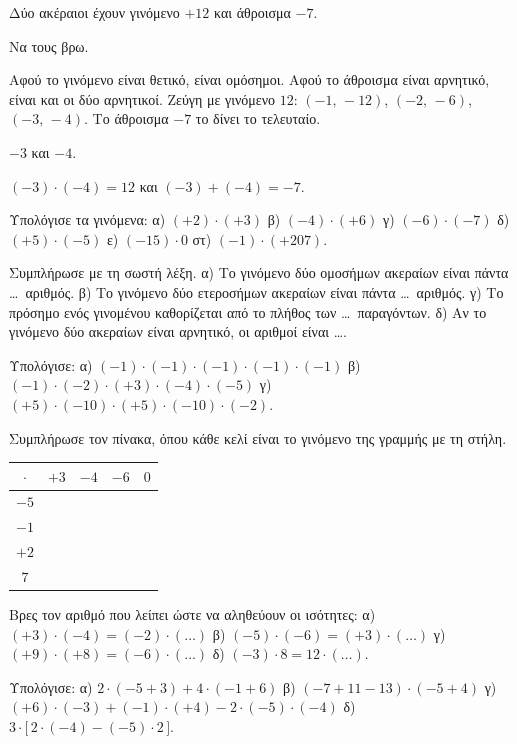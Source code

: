 \tixero Δύο ακέραιοι έχουν γινόμενο $+12$ και άθροισμα $-7$.\par
\tithelo Να τους βρω.\par
\possindeo Αφού το γινόμενο είναι θετικό, είναι ομόσημοι. Αφού το άθροισμα είναι αρνητικό, είναι και οι δύο αρνητικοί. Ζεύγη με γινόμενο $12$: $(-1,\,-12)$, $(-2,\,-6)$, $(-3,\,-4)$. Το άθροισμα $-7$ το δίνει το τελευταίο.\par
\apantisi $-3$ και $-4$.\par
\elegxos $(-3)\cdot(-4)=12$ και $(-3)+(-4)=-7$.



\ex Υπολόγισε τα γινόμενα: α) $(+2)\cdot(+3)$ \quad β) $(-4)\cdot(+6)$ \quad γ) $(-6)\cdot(-7)$ \quad δ) $(+5)\cdot(-5)$ \quad ε) $(-15)\cdot0$ \quad στ) $(-1)\cdot(+207)$.

\ex Συμπλήρωσε με τη σωστή λέξη. α) Το γινόμενο δύο ομοσήμων ακεραίων είναι πάντα \ldots\ αριθμός. β) Το γινόμενο δύο ετεροσήμων ακεραίων είναι πάντα \ldots\ αριθμός. γ) Το πρόσημο ενός γινομένου καθορίζεται από το πλήθος των \ldots\ παραγόντων. δ) Αν το γινόμενο δύο ακεραίων είναι αρνητικό, οι αριθμοί είναι \ldots.

\ex Υπολόγισε: α) $(-1)\cdot(-1)\cdot(-1)\cdot(-1)\cdot(-1)$ \quad β) $(-1)\cdot(-2)\cdot(+3)\cdot(-4)\cdot(-5)$ \quad γ) $(+5)\cdot(-10)\cdot(+5)\cdot(-10)\cdot(-2)$.

\ex Συμπλήρωσε τον πίνακα, όπου κάθε κελί είναι το γινόμενο της γραμμής με τη στήλη.
\begin{center}
\renewcommand{\arraystretch}{1.3}
\begin{tabular}{c|c|c|c|c}
$\cdot$ & $+3$ & $-4$ & $-6$ & $0$\\\hline
$-5$ & & & &\\\hline
$-1$ & & & &\\\hline
$+2$ & & & &\\\hline
$7$ & & & &\\
\end{tabular}
\end{center}

\ex Βρες τον αριθμό που λείπει ώστε να αληθεύουν οι ισότητες: α) $(+3)\cdot(-4)=(-2)\cdot(\ldots)$ \quad β) $(-5)\cdot(-6)=(+3)\cdot(\ldots)$ \quad γ) $(+9)\cdot(+8)=(-6)\cdot(\ldots)$ \quad δ) $(-3)\cdot8=12\cdot(\ldots)$.

\ex Υπολόγισε: α) $2\cdot(-5+3)+4\cdot(-1+6)$ \quad β) $(-7+11-13)\cdot(-5+4)$ \quad γ) $(+6)\cdot(-3)+(-1)\cdot(+4)-2\cdot(-5)\cdot(-4)$ \quad δ) $3\cdot\big[\,2\cdot(-4)-(-5)\cdot2\,\big]$.

